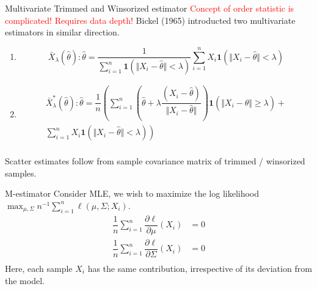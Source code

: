 \documentclass[10pt,xcolor=svgnames]{beamer} %
\newcommand{\bb}[1]{\boldsymbol{#1}}
\begin{document}
\begin{frame}{Multivariate Trimmed and Winsorized estimator}
    \textcolor{red}{Concept of order statistic is complicated! Requires data depth!}
    Bickel (1965) introducted two multivariate estimators in similar direction.
    \begin{enumerate}
        \item {} 
        \begin{equation*}
            \bar{X}_{\lambda}(\widehat{\theta}): \widehat{\theta} = \dfrac{1}{\sum_{i=1}^n \bb{1}(\Vert X_i - \widehat{\theta} \Vert < \lambda ) } \sum_{i=1}^n X_i\bb{1}(\Vert X_i - \widehat{\theta} \Vert < \lambda )
        \end{equation*}
        \pause
        \item {}
        \begin{multline*}
            \bar{X}_{\lambda}^\ast(\widehat{\theta}): \widehat{\theta} = \dfrac{1}{n} \left(  \sum_{i=1}^n \left(\widehat{\theta} + \lambda \dfrac{(X_i - \widehat{\theta})}{\Vert X_i - \widehat{\theta} \Vert }\right) \bb{1}(\Vert X_i - \widehat{\theta} \Vert \geq \lambda ) + \right. \\
            \left.  \sum_{i=1}^n X_i\bb{1}(\Vert X_i - \widehat{\theta} \Vert < \lambda ) \right) \\           
        \end{multline*}
    \end{enumerate}
    Scatter estimates follow from sample covariance matrix of trimmed / winsorized samples.
\end{frame}




\begin{frame}{M-estimator}
    Consider MLE, we wish to maximize the log likelihood $\max_{\mu, \Sigma}n^{-1}\sum_{i=1}^n \ell(\mu, \Sigma; X_i)$.
    \begin{equation*}
       \begin{split}
            \dfrac{1}{n}\sum_{i=1}^n \dfrac{\partial \ell}{\partial \mu}(X_i) & = 0\\
            \dfrac{1}{n}\sum_{i=1}^n \dfrac{\partial \ell}{\partial \Sigma}(X_i) & = 0\\
       \end{split}
    \end{equation*}
    Here, each sample $X_i$ has the same contribution, irrespective of its deviation from the model.
\end{frame}
\end{document}
